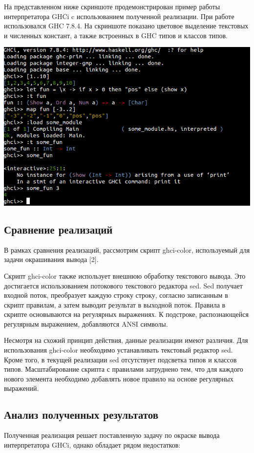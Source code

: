 \newpage

На представленном ниже скриншоте продемонстрирован пример работы интерпретатора GHCi c использованием полученной реализации. При работе использовался GHC 7.8.4. На скриншоте показано цветовое выделение текстовых и численных констант, а также встроенных в GHC типов и классов типов.

\centerline{\includegraphics[scale=0.75]{img/example.png}}
\subsection{Сравнение реализаций}
В рамках сравнения реализаций, рассмотрим скрипт ghci-color, используемый для задачи окрашивания вывода [2].

Скрипт ghci-color также использует внешнюю обработку текстового вывода. Это достигается использованием потокового текстового редактора sed. Sed получает входной поток, преобразует каждую строку строку, согласно записанным в скрипт правилам, а затем выводит результат в выходной поток. Правила в скрипте основываются на регулярных выражениях. К подстроке, распознающейся регулярным выражением, добавляются ANSI символы.

Несмотря на схожий принцип действия, данные реализации имеют различия. Для использования ghci-color необходимо устанавливать текстовый редактор sed. Кроме того, в текущей реализации sed отсутствует подсветка типов и классов типов. Масштабирование скрипта с правилами затруднено тем, что для каждого нового элемента необходимо добавлять новое правило на основе регулярных выражений.

\subsection{Анализ полученных результатов}
Полученная реализация решает поставленную задачу по окраске вывода интерпретатора GHCi, однако обладает рядом недостатков:

